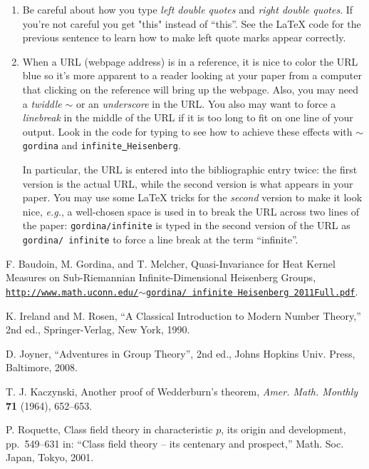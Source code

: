 \documentclass[12pt,letterpaper]{amsart}
\theoremstyle{plain}
\theoremstyle{definition}
\numberwithin{equation}{section}
\begin{document}
\begin{enumerate}

\item 
Be careful about how you type {\it left double quotes} and {\it right double quotes}.  
If you're not careful you get "this" instead of ``this''. See the LaTeX code for the previous sentence to learn how to make left quote marks appear correctly. 

\item
When a URL (webpage address) is in a reference, it is nice to color the URL blue so it's more apparent to a reader looking at your paper from a computer that clicking on the reference will bring up the webpage. Also, you  
may need a {\it twiddle} $\sim$ or an {\it underscore} \underline{ } in the URL.  You also may want to force a {\it linebreak} in the middle of the URL if it is too long to fit on one line of your output. Look in the code for typing \cite{gordina} to see how to achieve these effects with {\tt $\sim$gordina} and 
{\tt infinite\underline{ }Heisenberg}.

In particular, the URL is entered into the bibliographic entry twice: the first version is the actual URL, while the second version is what appears in your paper. You may use some LaTeX tricks for the {\it second} version to make it look nice, {\it e.g.}, a well-chosen space is used in 
\cite{gordina} to break the URL across two lines of the paper: {\tt gordina/infinite} is typed in the second version of the URL 
as {\tt gordina/ infinite} to force a line break at the term ``infinite''.


\end{enumerate}


\begin{thebibliography}{3}


F. Baudoin, M. Gordina, and T. Melcher, Quasi-Invariance for Heat Kernel Measures on Sub-Riemannian Infinite-Dimensional Heisenberg Groups, 
{\color{blue}\href{http://www.math.uconn.edu/~gordina/infinite_Heisenberg_2011Full.pdf}{\tt http://www.math.uconn.edu/$\sim$gordina/ infinite\underline{ }Heisenberg\underline{ }2011Full.pdf}}.


K. Ireland and M. Rosen, ``A Classical Introduction to Modern 
Number Theory,'' 2nd ed., Springer-Verlag, New York, 1990.

D. Joyner, ``Adventures in Group Theory'', 2nd ed., Johns Hopkins Univ. Press, 
Baltimore, 2008.

T. J. Kaczynski, Another proof of Wedderburn's theorem, 
{\it Amer. Math. Monthly} {\bf 71} (1964), 652--653.


P. Roquette, Class field theory in characteristic $p$, its origin 
and development, pp.~549--631 in: ``Class field theory -- its centenary 
and prospect,'' Math. Soc. Japan, Tokyo, 2001.






\end{thebibliography}
\end{document}
